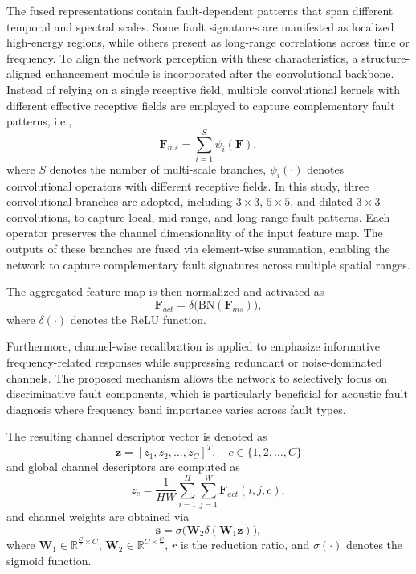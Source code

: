 \documentclass[anonymous]{iopjournal}
\begin{document}
The fused representations contain fault-dependent patterns that span different temporal and spectral scales. Some fault signatures are manifested as localized high-energy regions, while others present as long-range correlations across time or frequency. To align the network perception with these characteristics, a structure-aligned enhancement module is incorporated after the convolutional backbone. Instead of relying on a single receptive field, multiple convolutional kernels with different effective receptive fields are employed to capture complementary fault patterns, i.e.,
\begin{equation}
	\boldsymbol{F}_{ms} = \sum_{i=1}^{S} \psi_i(\boldsymbol{F}),
	\label{eq:multi_scale_feature}
\end{equation}
where $S$ denotes the number of multi-scale branches, $\psi_i(\cdot)$ denotes convolutional operators with different receptive fields. In this study, three convolutional branches are adopted, including $3\times3$, $5\times5$, and dilated $3\times3$ convolutions, to capture local, mid-range, and long-range fault patterns. Each operator preserves the channel dimensionality of the input feature map. The outputs of these branches are fused via element-wise summation, enabling the network to capture complementary fault signatures across multiple spatial ranges.

The aggregated feature map is then normalized and activated as
\begin{equation}
	\boldsymbol{F}_{act} = \delta\big(\text{BN}(\boldsymbol{F}_{ms})\big),
	\label{eq:active_feature}
\end{equation}
where $\delta(\cdot)$ denotes the ReLU function.

Furthermore, channel-wise recalibration is applied to emphasize informative frequency-related responses while suppressing redundant or noise-dominated channels. The proposed mechanism allows the network to selectively focus on discriminative fault components, which is particularly beneficial for acoustic fault diagnosis where frequency band importance varies across fault types. 

The resulting channel descriptor vector is denoted as
\begin{equation}
	\boldsymbol{z} = [z_1, z_2, \dots, z_C]^T, \quad c \in \{1,2,\dots,C\}
\end{equation}
and global channel descriptors are computed as
\begin{equation}
	z_c = \frac{1}{HW} \sum_{i=1}^{H} \sum_{j=1}^{W} \boldsymbol{F}_{act}(i, j, c),
	\label{eq:channel_embedding}
\end{equation}
and channel weights are obtained via
\begin{equation}
	\boldsymbol{s} = \sigma\big(\boldsymbol{W}_2 \delta(\boldsymbol{W}_1 \boldsymbol{z})\big),
	\label{eq:attention_score}
\end{equation}
where $\boldsymbol{W}_1 \in \mathbb{R}^{\frac{C}{r}\times C}$, $\boldsymbol{W}_2 \in \mathbb{R}^{C\times \frac{C}{r}}$, $r$ is the reduction ratio, and $\sigma(\cdot)$ denotes the sigmoid function. 
\end{document}
